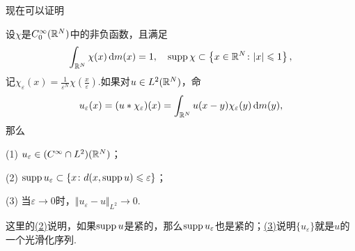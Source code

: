 现在可以证明
\begin{theorem}\label{thm6.1.1}
	设$\chi$是$C_0^\infty(\mathbb R^N)$中的非负函数，且满足
	\[\int_{\mathbb R^N}\chi(x)\mathop{}\!\mathrm{d} m(x)=1,\quad \operatorname{supp}\chi\subset\left\{x\in\mathbb R^N\colon |x|\leqslant1\right\},\]
	记$\chi_\varepsilon(x)=\frac1{\varepsilon^N}\chi\left(\frac{x}{\varepsilon}\right)$.如果对$u\in L^2(\mathbb R^N)$，命
	\[u_\varepsilon(x)=(u\ast\chi_\varepsilon)(x)=\int_{\mathbb R^N}u(x-y)\chi_\varepsilon(y)\mathop{}\!\mathrm{d} m(y),\]
	那么
	
	(1)\hypertarget{6.1.1}{}
	$u_\varepsilon\in(C^\infty\cap L^2)(\mathbb R^N)$；
	
	(2)\hypertarget{6.1.1}{}
	$\operatorname{supp} u_\varepsilon\subset\{x\colon d(x,\operatorname{supp} u)\leqslant\varepsilon\}$；
	
	(3)\hypertarget{6.1.1}{}
	当$\varepsilon\to0$时，$\Vert u_\varepsilon -u\Vert_{L^2}\to0$.
	
	这里的\hyperlink{6.1.1}{(2)}说明，如果$\operatorname{supp} u$是紧的，那么$\operatorname{supp} u_\varepsilon$也是紧的；\hyperlink{6.1.1}{(3)}说明$\{u_\varepsilon\}$就是$u$的一个光滑化序列.
\end{theorem}
